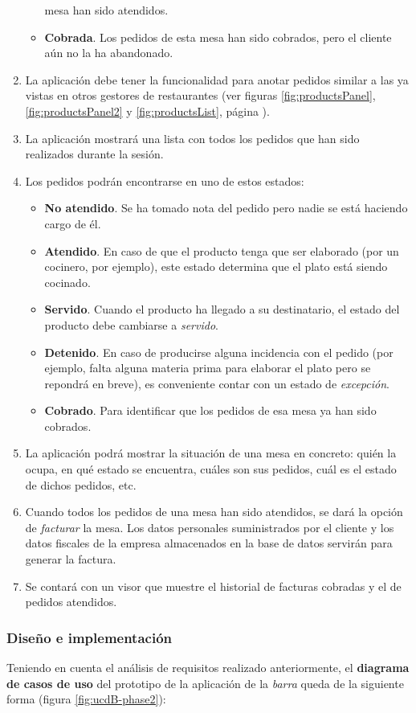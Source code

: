 \begin{enumerate}
\begin{itemize}
  mesa han sido atendidos.
  \item \textbf{Cobrada}. Los pedidos de esta mesa han sido cobrados, pero el
  cliente aún no la ha abandonado.
  \end{itemize}
\item La aplicación debe tener la funcionalidad para anotar pedidos similar a 
las ya vistas en otros gestores de restaurantes (ver figuras
\ref{fig:productsPanel}, \ref{fig:productsPanel2} y \ref{fig:productsList},
página \pageref{fig:productsPanel}).
\item La aplicación mostrará una lista con todos los pedidos que han sido
realizados durante la sesión.
\item Los pedidos podrán encontrarse en uno de estos estados:
  \begin{itemize}
  \item \textbf{No atendido}. Se ha tomado nota del pedido pero nadie se está
  haciendo cargo de él.
  \item \textbf{Atendido}. En caso de que el producto tenga que ser elaborado
  (por un cocinero, por ejemplo), este estado determina que el plato está
  siendo cocinado.
  \item \textbf{Servido}. Cuando el producto ha llegado a su destinatario, el
  estado del producto debe cambiarse a \emph{servido}.
  \item \textbf{Detenido}. En caso de producirse alguna incidencia con el
  pedido (por ejemplo, falta alguna materia prima para elaborar
  el plato pero se repondrá en breve), es conveniente contar con un estado
  de \emph{excepción}.
  \item \textbf{Cobrado}. Para identificar que los pedidos de esa mesa ya han
  sido cobrados.
  \end{itemize}
\item La aplicación podrá mostrar la situación de una mesa en concreto: quién
la ocupa, en qué estado se encuentra, cuáles son sus pedidos, cuál es el
estado de dichos pedidos, etc.
\item Cuando todos los pedidos de una mesa han sido atendidos, se dará la
opción de \emph{facturar} la mesa. Los datos personales suministrados por el
cliente y los datos fiscales de la empresa almacenados en la base de datos
servirán para generar la factura.
\item Se contará con un visor que muestre el historial de facturas cobradas y
el de pedidos atendidos.
\end{enumerate}

\subsubsection{Diseño e implementación}
Teniendo en cuenta el análisis de requisitos realizado anteriormente, el
\textbf{diagrama de casos de uso} del prototipo de la aplicación de la
\emph{barra} queda de la siguiente forma (figura \ref{fig:ucdB-phase2}):

